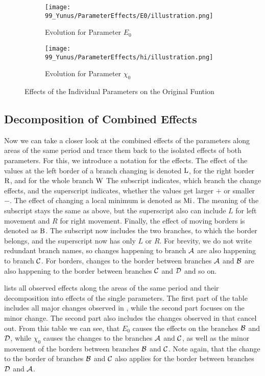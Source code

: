 \begin{figure}
	\centering
	\begin{subfigure}{0.4\textwidth}
		\texttt{[image: 99\_Yunus/ParameterEffects/E0/illustration.png]}
		\caption{Evolution for Parameter $E_0$}
		\label{fig:yunus.function.evolution.e0}
	\end{subfigure}
	\begin{subfigure}{0.4\textwidth}
		\texttt{[image: 99\_Yunus/ParameterEffects/hi/illustration.png]}
		\caption{Evolution for Parameter $\chi_0$}
		\label{fig:yunus.function.evolution.hi}
	\end{subfigure}
	\caption{Effects of the Individual Parameters on the Original Funtion}
\end{figure}

\subsection{Decomposition of Combined Effects}
\label{sec:yunus.param.effects.decomposition}

Now we can take a closer look at the combined effects of the parameters along areas of the same period and trace them back to the isolated effects of both parameters.
For this, we introduce a notation for the effects.
The effect of the values at the left border of a branch changing is denoted $\operatorname{L}$, for the right border $\operatorname{R}$, and for the whole branch $\operatorname{W}$
The subscript indicates, which branch the change effects, and the superscript indicates, whether the values get larger $+$ or smaller $-$.
The effect of changing a local minimum is denoted as $\operatorname{Mi}$.
The meaning of the subscript stays the same as above, but the superscript also can include $L$ for left movement and $R$ for right movement.
Finally, the effect of moving borders is denoted as $\operatorname{B}$.
The subscript now includes the two branches, to which the border belongs, and the superscript now has only $L$ or $R$.
For brevity, we do not write redundant branch names, so changes happening to branch $\mathcal{A}$ are also happening to branch $\mathcal{C}$.
For borders, changes to the border between branches $\mathcal{A}$ and $\mathcal{B}$ are also happening to the border between branches $\mathcal{C}$ and $\mathcal{D}$ and so on.

 lists all observed effects along the areas of the same period and their decomposition into effects of the single parameters.
The first part of the table includes all major changes observed in , while the second part focuses on the minor change.
The second part also includes the changes observed in  that cancel out.
From this table we can see, that $E_0$ causes the effects on the branches $\mathcal{B}$ and $\mathcal{D}$, while $\chi_0$ causes the changes to the branches $\mathcal{A}$ and $\mathcal{C}$, as well as the minor movement of the borders between branches $\mathcal{B}$ and $\mathcal{C}$.
Note again, that the change to the border of branches $\mathcal{B}$ and $\mathcal{C}$ also applies for the border between branches $\mathcal{D}$ and $\mathcal{A}$.

